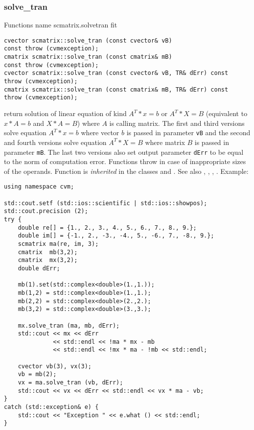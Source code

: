 \subsubsection{solve\_tran}
Functions%
\pdfdest name {scmatrix.solvetran} fit
\begin{verbatim}
cvector scmatrix::solve_tran (const cvector& vB)
const throw (cvmexception);
cmatrix scmatrix::solve_tran (const cmatrix& mB)
const throw (cvmexception);
cvector scmatrix::solve_tran (const cvector& vB, TR& dErr) const
throw (cvmexception);
cmatrix scmatrix::solve_tran (const cmatrix& mB, TR& dErr) const
throw (cvmexception);
\end{verbatim}
return  solution of  linear equation of kind $A^T*x=b$ or $A^T*X=B$
(equivalent to $x*A=b$ and $X*A=B$)
where $A$ is  calling matrix. The first and third versions
solve  equation $A^T*x=b$ where vector $b$ is passed in 
 parameter \verb"vB"
and the second and fourth versions
solve equation $A^T*X=B$ where matrix $B$ is passed 
in parameter \verb"mB".
The last two versions also set output parameter \verb"dErr" to be equal
to the norm of computation error.
Functions throw 
in case of inappropriate sizes of the operands.
Function is \emph{inherited} in the classes
and .
See also
,
,
,
.
Example:
\begin{Verbatim}
using namespace cvm;

std::cout.setf (std::ios::scientific | std::ios::showpos);
std::cout.precision (2);
try {
    double re[] = {1., 2., 3., 4., 5., 6., 7., 8., 9.};
    double im[] = {-1., 2., -3., -4., 5., -6., 7., -8., 9.};
    scmatrix ma(re, im, 3);
    cmatrix  mb(3,2);
    cmatrix  mx(3,2);
    double dErr;

    mb(1).set(std::complex<double>(1.,1.));
    mb(1,2) = std::complex<double>(1.,1.);
    mb(2,2) = std::complex<double>(2.,2.);
    mb(3,2) = std::complex<double>(3.,3.);

    mx.solve_tran (ma, mb, dErr);
    std::cout << mx << dErr 
              << std::endl << !ma * mx - mb
              << std::endl << !mx * ma - !mb << std::endl;

    cvector vb(3), vx(3);
    vb = mb(2);
    vx = ma.solve_tran (vb, dErr);
    std::cout << vx << dErr << std::endl << vx * ma - vb;
}
catch (std::exception& e) {
    std::cout << "Exception " << e.what () << std::endl;
}
\end{Verbatim}
